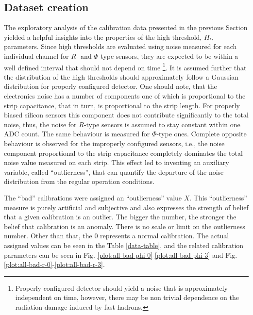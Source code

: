 \subsection{Dataset creation}
The exploratory analysis of the calibration data presented in the previous Section yielded a helpful insights into the properties of the high threshold, $H_t$, parameters.
Since high thresholds are evaluated using noise measured for each individual channel for $R$- and $\Phi$-type sensors, they are expected to be within a well defined interval that should not depend on time \footnote{Properly configured detector should yield a noise that is approximately independent on time, however, there may be non trivial dependence on the radiation damage induced by fast hadrons.}.
It is assumed further that the distribution of the high thresholds should approximately follow a Gaussian distribution for properly configured detector. One should note, that the electronics noise has a number of components one of which is proportional to the strip capacitance, that in turn, is proportional to the strip length. For properly biased silicon sensors this component does not contribute significantly to the total noise, thus, the noise for $R$-type sensors is assumed to stay constant within one ADC count. The same behaviour is measured for $\Phi$-type ones. Complete opposite behaviour is observed for the improperly configured sensors, i.e., the noise component proportional to the strip capacitance completely dominates the total noise value measured on each strip. This effect led to inventing an auxiliary variable, called ``outlierness'', that can quantify the departure of the noise distribution from the regular operation conditions.

The ``bad'' calibrations were assigned an ``outlierness'' value $X$.
This ``outlierness'' measure is purely artificial and subjective and also expresses the strength of belief that a given calibration is an outlier.
The bigger the number, the stronger the belief that calibration is an anomaly.
There is no scale or limit on the outlierness number. Other than that, the 0 represents a normal calibration.
The actual assigned values can be seen in the Table \ref{data-table}, and the related calibration parameters can be seen in Fig. \ref{plot:all-bad-phi-0}-\ref{plot:all-bad-phi-3} and Fig. \ref{plot:all-bad-r-0}-\ref{plot:all-bad-r-3}.

